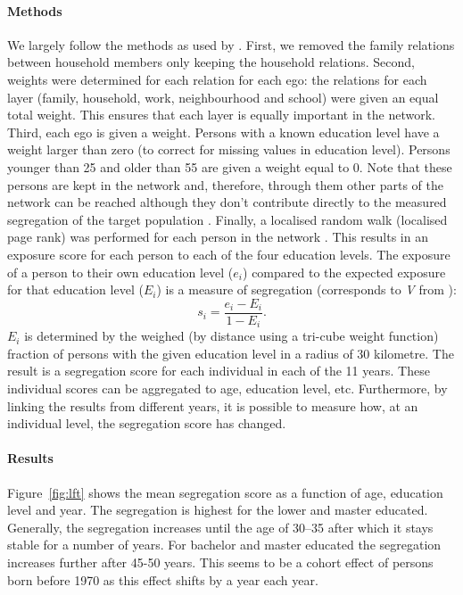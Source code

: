 \documentclass[a4paper,12pt]{article}
\begin{document}
\paragraph{Methods}
We largely follow the methods as used by \cite{Laan2022}. First, we removed the family relations between household members only keeping the household relations. Second, weights were determined for each relation for each ego: the relations for each layer (family, household, work, neighbourhood and school) were given an equal total weight. This ensures that each layer is equally important in the network. Third, each ego is given a weight. Persons with a known education level have a weight larger than zero (to correct for missing values in education level). Persons younger than 25 and older than 55 are given a weight equal to 0. Note that these persons are kept in the network and, therefore, through them other parts of the network can be reached although they don't contribute directly to the measured segregation of the target population . Finally, a localised random walk (localised page rank) was performed for each person in the network \citep{Ballester2014}. This results in an exposure score for each person to each of the four education levels. The exposure of a person to their own education level ($e_i$) compared to the expected exposure for that education level ($E_i$) is a measure of segregation (corresponds to \textit{V} from \cite{Massey1988}):
\begin{equation}
  s_i = \frac{e_i - E_i}{1 - E_i}.
\end{equation}
$E_i$ is determined by the weighed (by distance using a tri-cube weight function) fraction of persons with the given education level in a radius of 30 kilometre. The result is a segregation score for each individual in each of the 11 years. These individual scores can be aggregated to age, education level, etc. Furthermore, by linking the results from different years, it is possible to measure how, at an individual level, the segregation score has changed. 

\paragraph{Results}
Figure~\ref{fig:lft} shows the mean segregation score as a function of age, education level and year. The segregation is highest for the lower and master educated. Generally, the segregation increases until the age of 30--35 after which it stays stable for a number of years. For bachelor and master educated the segregation increases further after 45-50 years. This seems to be a cohort effect of persons born before 1970 as this effect shifts by a year each year.  
\end{document}
